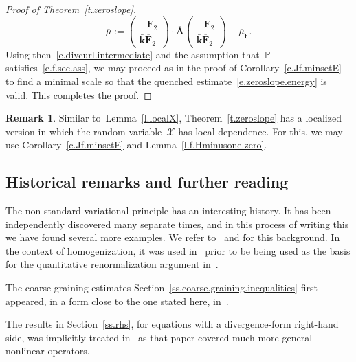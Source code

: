 \documentclass[11pt,twoside]{article} %
\numberwithin{equation}{section}
\theoremstyle{definition}
\newtheorem{remark}[theorem]{Remark}
\newcommand{\f}{\mathbf{f}}
\newcommand{\khom}{\bar{\mathbf{k}}}
\renewcommand{\P}{\mathbb{P}}
\newcommand{\X}{\mathcal{X}}
\newcommand{\bfAhom}{\overline{\mathbf{A}}}
\newcommand{\bfF}{\mathbf{F}}
\begin{document}
\begin{proof}[{Proof of Theorem~\ref{t.zeroslope}}]
\begin{equation*}
\overline{\mu} := 
\begin{pmatrix} -\overline{\bfF}_2 \\ \khom \overline{\bfF}_2\end{pmatrix} \cdot \bfAhom \begin{pmatrix} - \overline{\bfF}_2 \\ \khom \overline{\bfF}_2\end{pmatrix}
-  \overline{\mu}_{\f} 
 \,.
\end{equation*}
Using then~\eqref{e.divcurl.intermediate} and the assumption that~$\P$ satisfies~\eqref{e.f.sec.ass}, we may proceed as in the proof of Corollary~\ref{c.Jf.minsetE} to find a minimal scale so that the quenched estimate~\eqref{e.zeroslope.energy} is valid. This completes the proof. 
\end{proof}


\begin{remark} \label{r.zeroslope}
Similar to~Lemma~\ref{l.localX}, 
Theorem~\ref{t.zeroslope} has a localized version in which the random variable~$\X$ has local dependence. For this, we may use Corollary~\ref{c.Jf.minsetE} and Lemma~\ref{l.f.Hminusone.zero}.
\end{remark}



\subsection*{Historical remarks and further reading}

The non-standard variational principle has an interesting history. It has been independently discovered many separate times, and in this process of writing this we have found several more examples. We refer to~\cite{AM} and\cite[Chapter 10]{AKMBook} for this background. In the context of homogenization, it was used in~\cite{FP1,GMS,ADMZ} prior to be being used as the basis for the quantitative renormalization argument in~\cite{AM}. 

The coarse-graining estimates Section~\ref{ss.coarse.graining.inequalities} first appeared, in a form close to the one stated here, in~\cite{AK.HC}. 

The results in Section~\ref{ss.rhs}, for  equations with a divergence-form right-hand side, was implicitly treated in~\cite{AM} as that paper covered much more general nonlinear operators. 





\end{document}
